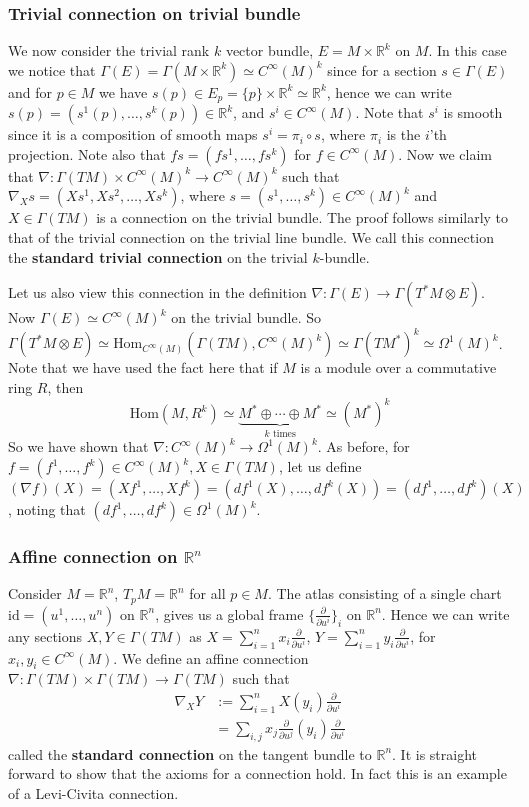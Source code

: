 \documentclass[a4paper]{article}
\theoremstyle{definition} \newtheorem*{definition}{Definition}
\theoremstyle{definition} \newtheorem*{definitions}{Definitions}
\theoremstyle{plain} \newtheorem{theorem}{Theorem}[section]
\theoremstyle{plain} \newtheorem{proposition}[theorem]{Proposition}
\theoremstyle{plain} \newtheorem{corollary}[theorem]{Corollary}
\theoremstyle{plain} \newtheorem{lemma}[theorem]{Lemma}
\theoremstyle{plain} \newtheorem{example}[theorem]{Example}
\newcommand{\defn}[1]{\textbf{#1}}
\newcommand{\realnos}{\mathbb{R}}
\newcommand{\Hom}{\text{Hom}}
\newcommand{\smooth}{C^\infty}
\begin{document}
\subsubsection{Trivial connection on trivial bundle}
We now consider the trivial rank $k$ vector bundle, $E=M\times \realnos^k$ on $M$. In this case we notice that $\Gamma(E)=\Gamma(M\times \realnos^k)\simeq \smooth (M)^k$ since for a section $s\in \Gamma(E)$ and for $p\in M$ we have $s(p)\in E_p=\{p\}\times \realnos^k\simeq \realnos^k$, hence we can write $s(p)=(s^1(p),\ldots, s^k(p))\in \realnos^k$, and $s^i\in \smooth(M)$. Note that $s^i$ is smooth since it is a composition of smooth maps $s^i=\pi_i\circ s$, where $\pi_i$ is the $i$'th projection. Note also that $fs=(fs^1, \ldots, fs^k)$ for $f\in \smooth(M)$. Now we claim that $\nabla:\Gamma(TM)\times \smooth(M)^k\to \smooth(M)^k$ such that $\nabla_X s = (Xs^1, Xs^2, \ldots, Xs^k)$, where $s=(s^1, \ldots, s^k)\in \smooth (M)^k$ and $X\in \Gamma(TM)$ is a connection on the trivial bundle. The proof follows similarly to that of the trivial connection on the trivial line bundle. We call this connection the \defn{standard trivial connection} on the trivial $k$-bundle. 

Let us also view this connection in the definition $\nabla:\Gamma(E)\to \Gamma(T^*M\otimes E)$. Now $\Gamma(E)\simeq \smooth(M)^k$ on the trivial bundle. So  $\Gamma(T^*M\otimes E)\simeq \Hom_{\smooth(M)}(\Gamma(TM), \smooth(M)^k)\simeq \Gamma(TM^*)^k \simeq \Omega^1(M)^k$. Note that we have used the fact here that if $M$ is a module over a commutative ring $R$, then 
$$\Hom(M, R^k)\simeq \underbrace{M^*\oplus \cdots \oplus M^*}_{k \text{ times}} \simeq (M^*)^{k}$$
So we have shown that $\nabla:\smooth(M)^k\to \Omega^1(M)^k$. As before, for $f=(f^1, \ldots, f^k)\in \smooth(M)^k, X\in \Gamma(TM)$, let us define $(\nabla f)(X)=(Xf^1, \ldots, Xf^k)=(df^1(X), \ldots, df^k(X))=(df^1, \ldots, df^k)(X)$, noting that $(df^1, \ldots, df^k)\in \Omega^1(M)^k$.

\subsubsection{Affine connection on $\realnos^n$}
Consider $M=\realnos^n$, $T_pM=\realnos^n$ for all $p\in M$.
The atlas consisting of a single chart $\text{id}=(u^1, \ldots, u^n)$ on $\realnos^n$, gives us a global frame $\{\frac{\partial}{\partial u^i}\}_i$ on $\realnos^n$. Hence we can write any sections $X, Y\in \Gamma(TM)$ as $X=\sum_{i=1}^n x_i \frac{\partial}{\partial u^i}$, $Y=\sum_{i=1}^n y_i \frac{\partial}{\partial u^i}$, for $x_i, y_i \in \smooth(M)$. We define an affine connection $\nabla:\Gamma(TM)\times \Gamma(TM)\to \Gamma(TM)$ such that 
\begin{align*}
\nabla_X Y & := \sum_{i=1}^n X(y_i) \frac{\partial}{\partial u^i} \\
& = \sum_{i, j} x_j\frac{\partial}{\partial u^j}(y_i)\frac{\partial}{\partial u^i}
\end{align*}
called the \defn{standard connection} on the tangent bundle to $\realnos^n$. It is straight forward to show that the axioms for a connection hold. In fact this is an example of a Levi-Civita connection.
\end{document}
